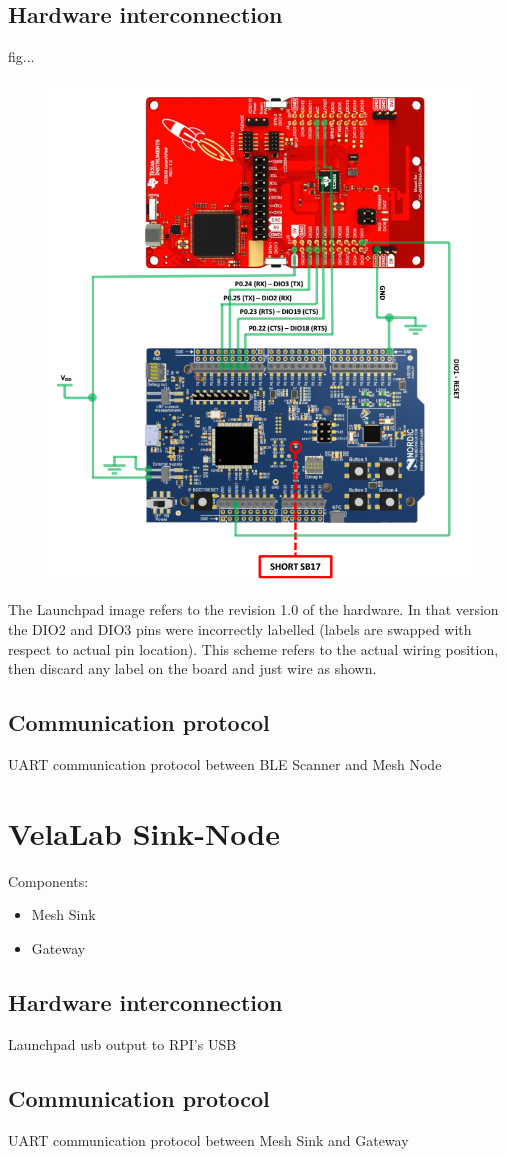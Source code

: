 \documentclass[12pt]{article}
\begin{document}
\subsection{Hardware interconnection}

fig...

\begin{figure}[!h]
	\centering
	\includegraphics[width=0.7\columnwidth]{fig/VelaNode_hw.png}
	\caption{}
	\label{fig:system}
\end{figure}

The Launchpad image refers to the revision 1.0 of the hardware. In that version the DIO2 and DIO3 pins were incorrectly labelled (labels are swapped with respect to actual pin location). This scheme refers to the actual wiring position, then discard any label on the board and just wire as shown.


\subsection{Communication protocol}

UART communication protocol between BLE Scanner and Mesh Node


\section{VelaLab Sink-Node}

Components:
\begin{itemize}
\item{Mesh Sink}
\item{Gateway}
\end{itemize}

\subsection{Hardware interconnection}


Launchpad usb output to RPI's USB


\subsection{Communication protocol}


UART communication protocol between Mesh Sink and Gateway







%
%
\end{document}
